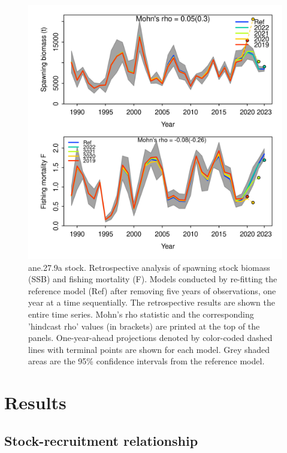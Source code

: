 \documentclass[
]{article}
\begin{document}
\begin{figure}[H]

{\centering \includegraphics[width=0.95\linewidth]{report/retro/S1.0_4FLEETS/Retro} 

}

\caption{ane.27.9a stock. Retrospective analysis of spawning stock biomass (SSB) and fishing mortality (F). Models  conducted by re-fitting the reference model (Ref) after removing five years of observations, one year at a time sequentially. The retrospective results are shown the entire time series. Mohn's rho statistic and the corresponding 'hindcast rho' values (in brackets) are printed at the top of the panels. One-year-ahead projections denoted by color-coded dashed lines with terminal points are shown for each model. Grey shaded areas are the 95\% confidence intervals from the reference model.}\label{fig:unnamed-chunk-29}
\end{figure}

\hypertarget{results}{%
\section{Results}\label{results}}

\hypertarget{stock-recruitment-relationship}{%
\subsection{Stock-recruitment
relationship}\label{stock-recruitment-relationship}}
\end{document}
